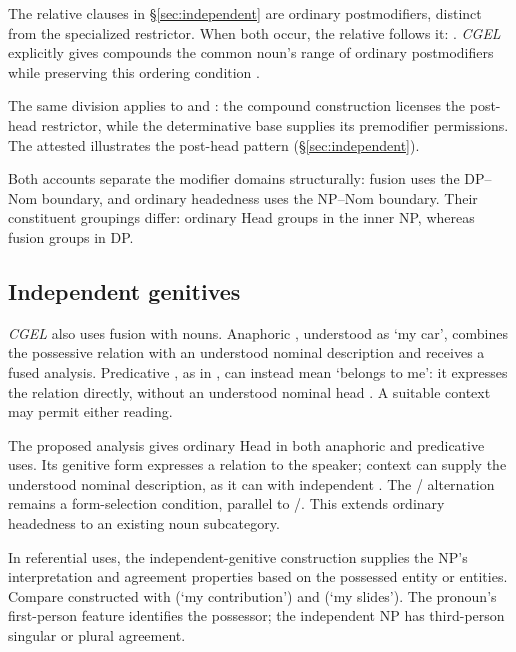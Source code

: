 \documentclass[12pt]{article}
\begin{document}
The relative clauses in §\ref{sec:independent} are ordinary postmodifiers, distinct from the specialized restrictor. When both occur, the relative follows it: . \textit{CGEL} explicitly gives compounds the common noun's range of ordinary postmodifiers while preserving this ordering condition \citep[423]{huddleston2002}.

The same division applies to  and : the compound construction licenses the post-head restrictor, while the determinative base supplies its premodifier permissions. The attested  illustrates the post-head pattern (§\ref{sec:independent}).

Both accounts separate the modifier domains structurally: fusion uses the DP--Nom boundary, and ordinary headedness uses the NP--Nom boundary. Their constituent groupings differ: ordinary Head groups  in the inner NP, whereas fusion groups  in DP.

\subsection{Independent genitives}\label{sec:genitive-head}

\textit{CGEL} also uses fusion with nouns. Anaphoric , understood as \enquote*{my car}, combines the possessive relation with an understood nominal description and receives a fused analysis. Predicative , as in , can instead mean \enquote*{belongs to me}: it expresses the relation directly, without an understood nominal head \citep[410--411, 470--471]{huddleston2002}. A suitable context may permit either reading.

The proposed analysis gives  ordinary Head in both anaphoric and predicative uses. Its genitive form expresses a relation to the speaker; context can supply the understood nominal description, as it can with independent . The / alternation remains a form-selection condition, parallel to /. This extends ordinary headedness to an existing noun subcategory.

In referential uses, the independent-genitive construction supplies the NP's interpretation and agreement properties based on the possessed entity or entities. Compare constructed  with  (\enquote*{my contribution}) and  (\enquote*{my slides}). The pronoun's first-person feature identifies the possessor; the independent NP has third-person singular or plural agreement.
\end{document}
